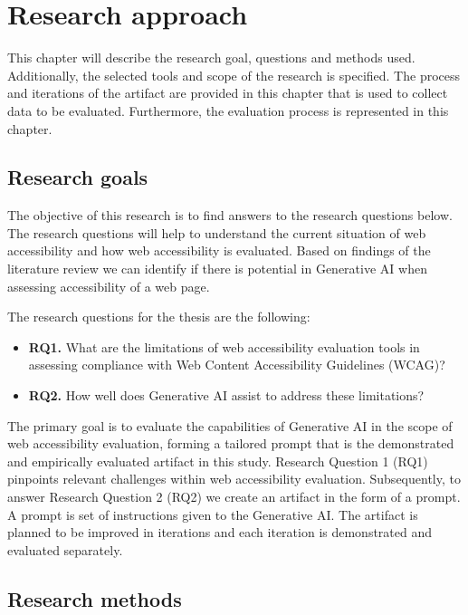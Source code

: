\chapter{Research approach\label{methods}}

This chapter will describe the research goal, questions and methods used. Additionally, the selected tools and scope of the research is specified. The process and iterations of the artifact are provided in this chapter that is used to collect data to be evaluated. Furthermore, the evaluation process is represented in this chapter.

\section{Research goals}

The objective of this research is to find answers to the research questions below. The research questions will help to understand the current situation of web accessibility and how web accessibility is evaluated. Based on findings of the literature review we can identify if there is potential in Generative AI when assessing accessibility of a web page. 

The research questions for the thesis are the following:

\begin{itemize}
    \item \textbf{RQ1.} What are the limitations of web accessibility evaluation tools in assessing compliance with Web Content Accessibility Guidelines (WCAG)?
    \item \textbf{RQ2.} How well does Generative AI assist to address these limitations?
\end{itemize}

The primary goal is to evaluate the capabilities of Generative AI in the scope of web accessibility evaluation, forming a tailored prompt that is the demonstrated and empirically evaluated artifact in this study. Research Question 1 (RQ1) pinpoints relevant challenges within web accessibility evaluation. Subsequently, to answer Research Question 2 (RQ2) we create an artifact in the form of a prompt. A prompt is set of instructions given to the Generative AI. The artifact is planned to be improved in iterations and each iteration is demonstrated and evaluated separately.

\section{Research methods}


